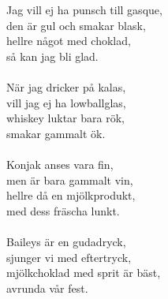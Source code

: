 {\footnotesize{}}\\
\\
Jag vill ej ha punsch till gasque,\\
den är gul och smakar blask,\\
hellre något med choklad,\\
så kan jag bli glad.\\
\\
När jag dricker på kalas,\\
vill jag ej ha lowballglas,\\
whiskey luktar bara rök,\\
smakar gammalt ök.\\
\\
Konjak anses vara fin,\\
men är bara gammalt vin,\\
hellre då en mjölkprodukt,\\
med dess fräscha lunkt.\\
\\
Baileys är en gudadryck,\\
sjunger vi med eftertryck,\\
mjölkchoklad med sprit är bäst,\\
avrunda vår fest.
